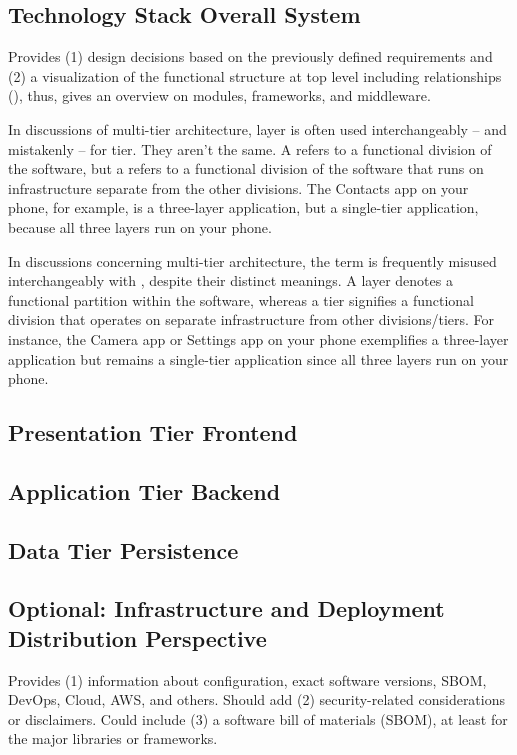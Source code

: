 \documentclass[conference,a4paper,flushend]{cs-techrep} %
\begin{document}
\subsection{Technology Stack \textbar{} Overall System} %
Provides
(1) design decisions based on the previously defined requirements and
(2) a visualization of the functional structure at top level including relationships (), thus, gives an overview on modules, frameworks, and middleware.

In discussions of multi-tier architecture, layer is often used interchangeably -- and mistakenly -- for tier. They aren't the same. A  refers to a functional division of the software, but a  refers to a functional division of the software that runs on infrastructure separate from the other divisions. The Contacts app on your phone, for example, is a three-layer application, but a single-tier application, because all three layers run on your phone.

In discussions concerning multi-tier architecture, the term  is frequently misused interchangeably with , despite their distinct meanings. A layer denotes a functional partition within the software, whereas a tier signifies a functional division that operates on separate infrastructure from other divisions/tiers. For instance, the Camera app or Settings app on your phone exemplifies a three-layer application but remains a single-tier application since all three layers run on your phone.


\subsection{Presentation Tier \textbar{} Frontend}
\lipsum[13]

\subsection{Application Tier \textbar{} Backend \textbar{} }
\lipsum[14]

\subsection{Data Tier \textbar{} Persistence}
\lipsum[15]

\subsection{Optional: Infrastructure and Deployment \textbar{} Distribution Perspective \textbar{} }
Provides (1) information about configuration, exact software versions, SBOM, DevOps, Cloud, AWS, and others.
Should add (2) security-related considerations or disclaimers.
Could include (3) a software bill of materials (SBOM), at least for the major libraries or frameworks.
\end{document}
